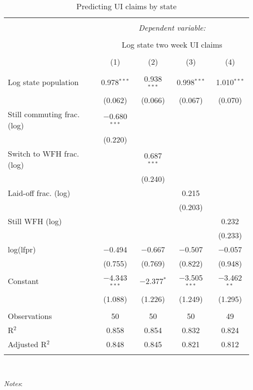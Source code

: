 
\begin{table}[!htbp] \centering 
  \caption{Predicting UI claims by state} 
  \label{tab:ui} 
\small 
\begin{tabular}{@{\extracolsep{5pt}}lcccc} 
\\[-1.8ex]\hline 
\hline \\[-1.8ex] 
 & \multicolumn{4}{c}{\textit{Dependent variable:}} \\ 
\cline{2-5} 
\\[-1.8ex] & \multicolumn{4}{c}{Log state two week UI claims} \\ 
\\[-1.8ex] & (1) & (2) & (3) & (4)\\ 
\hline \\[-1.8ex] 
 Log state population & 0.978$^{***}$ & 0.938$^{***}$ & 0.998$^{***}$ & 1.010$^{***}$ \\ 
  & (0.062) & (0.066) & (0.067) & (0.070) \\ 
  Still commuting frac. (log) & $-$0.680$^{***}$ &  &  &  \\ 
  & (0.220) &  &  &  \\ 
  Switch to WFH frac. (log) &  & 0.687$^{***}$ &  &  \\ 
  &  & (0.240) &  &  \\ 
  Laid-off frac. (log) &  &  & 0.215 &  \\ 
  &  &  & (0.203) &  \\ 
  Still WFH (log) &  &  &  & 0.232 \\ 
  &  &  &  & (0.233) \\ 
  log(lfpr) & $-$0.494 & $-$0.667 & $-$0.507 & $-$0.057 \\ 
  & (0.755) & (0.769) & (0.822) & (0.948) \\ 
  Constant & $-$4.343$^{***}$ & $-$2.377$^{*}$ & $-$3.505$^{***}$ & $-$3.462$^{**}$ \\ 
  & (1.088) & (1.226) & (1.249) & (1.295) \\ 
 \hline \\[-1.8ex] 
Observations & 50 & 50 & 50 & 49 \\ 
R$^{2}$ & 0.858 & 0.854 & 0.832 & 0.824 \\ 
Adjusted R$^{2}$ & 0.848 & 0.845 & 0.821 & 0.812 \\ 
\hline 
\hline \\[-1.8ex] 
\end{tabular}
\\
\begin{minipage}{1.0 \textwidth}
{\footnotesize \emph{Notes}: 
\starlanguage}
\end{minipage}
\end{table}
